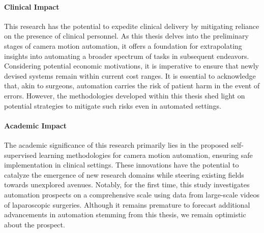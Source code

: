 \paragraph{Clinical Impact} This research has the potential to expedite clinical delivery by mitigating reliance on the presence of clinical personnel. As this thesis delves into the preliminary stages of camera motion automation, it offers a foundation for extrapolating insights into automating a broader spectrum of tasks in subsequent endeavors. Considering potential economic motivations, it is imperative to ensure that newly devised systems remain within current cost ranges. It is essential to acknowledge that, akin to surgeons, automation carries the risk of patient harm in the event of errors. However, the methodologies developed within this thesis shed light on potential strategies to mitigate such risks even in automated settings.

\paragraph{Academic Impact} The academic significance of this research primarily lies in the proposed self-supervised learning methodologies for camera motion automation, ensuring safe implementation in clinical settings. These innovations have the potential to catalyze the emergence of new research domains while steering existing fields towards unexplored avenues. Notably, for the first time, this study investigates automation prospects on a comprehensive scale using data from large-scale videos of laparoscopic surgeries. Although it remains premature to forecast additional advancements in automation stemming from this thesis, we remain optimistic about the prospect. 

